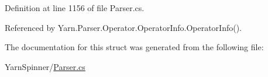 Definition at line 1156 of file Parser.\-cs.



Referenced by Yarn.\-Parser.\-Operator.\-Operator\-Info.\-Operator\-Info().



The documentation for this struct was generated from the following file\-:\begin{DoxyCompactItemize}
\item 
Yarn\-Spinner/\hyperlink{a00301}{Parser.\-cs}\end{DoxyCompactItemize}
